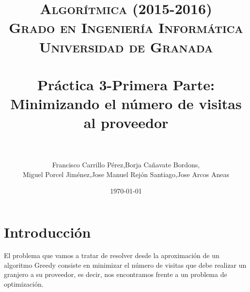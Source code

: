 
 \usepackage{algpseudocode}

\title{	
\normalfont \normalsize 
\textsc{{\bf Algorítmica (2015-2016)} \\ Grado en Ingeniería Informática \\ Universidad de Granada} \\ [25pt] %
\horrule{0.5pt} \\[0.4cm] %
\huge Práctica 3-Primera Parte: Minimizando el número de visitas al proveedor \\ %
\horrule{2pt} \\[0.5cm] %
}

\author{Francisco Carrillo Pérez,Borja Cañavate Bordons, \\Miguel Porcel Jiménez,Jose Manuel Rejón Santiago,Jose Arcos Aneas} %

\date{\normalsize\today} %




\maketitle %

\newpage %

\tableofcontents %

\listoffigures

\listoftables

\newpage

\section{Introducción }

El problema que vamos a tratar de resolver desde la aproximación de un algoritmo Greedy consiste en minimizar el número de visitas que debe realizar un granjero a su proveedor, es decir, nos encontramos frente a un problema de optimización.
	
